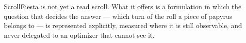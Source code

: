 ScrollFiesta is not yet a read scroll. What it offers is a formulation in which the question that decides the answer --- which turn of the roll a piece of papyrus belongs to --- is represented explicitly, measured where it is still observable, and never delegated to an optimizer that cannot see it.
